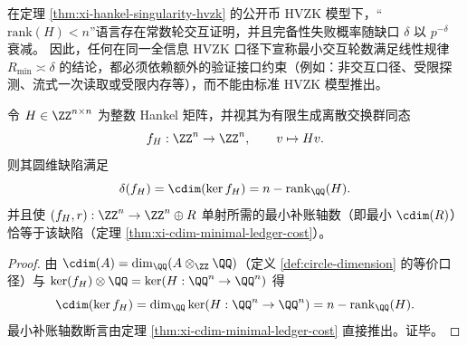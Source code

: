 \begin{corollary}[常数轮与缺口线性轮数的不可兼容性]\label{cor:xi-hankel-hvzk-constant-round-vs-defect-linear-round}
在定理 \ref{thm:xi-hankel-singularity-hvzk} 的公开币 HVZK 模型下，“\(\mathrm{rank}(H)<n\)”语言存在常数轮交互证明，并且完备性失败概率随缺口 \(\delta\) 以 \(p^{-\delta}\) 衰减。
因此，任何在同一全信息 HVZK 口径下宣称最小交互轮数满足线性规律
\(
R_{\min}\asymp \delta
\)
的结论，都必须依赖额外的验证接口约束（例如：非交互口径、受限探测、流式一次读取或受限内存等），而不能由标准 HVZK 模型推出。
\end{corollary}

\begin{corollary}\label{cor:xi-hankel-defect-cdim-minimal-ledger}
令 \(H\in\ZZ^{n\times n}\) 为整数 Hankel 矩阵，并视其为有限生成离散交换群同态
\[
f_H:\ZZ^n\to\ZZ^n,\qquad v\mapsto Hv.
\]
则其圆维缺陷满足
\[
\delta(f_H)=\cdim(\ker f_H)=n-\mathrm{rank}_{\QQ}(H).
\]
并且使 \((f_H,r):\ZZ^n\to\ZZ^n\oplus R\) 单射所需的最小补账轴数（即最小 \(\cdim(R)\)）恰等于该缺陷（定理 \ref{thm:xi-cdim-minimal-ledger-cost}）。
\end{corollary}
\begin{proof}
由 \(\cdim(A)=\dim_{\QQ}(A\otimes_{\ZZ}\QQ)\)（定义 \ref{def:circle-dimension} 的等价口径）与 \(\ker(f_H)\otimes\QQ=\ker(H:\QQ^n\to\QQ^n)\) 得
\[
\cdim(\ker f_H)=\dim_{\QQ}\ker(H:\QQ^n\to\QQ^n)=n-\mathrm{rank}_{\QQ}(H).
\]
最小补账轴数断言由定理 \ref{thm:xi-cdim-minimal-ledger-cost} 直接推出。证毕。
\end{proof}

